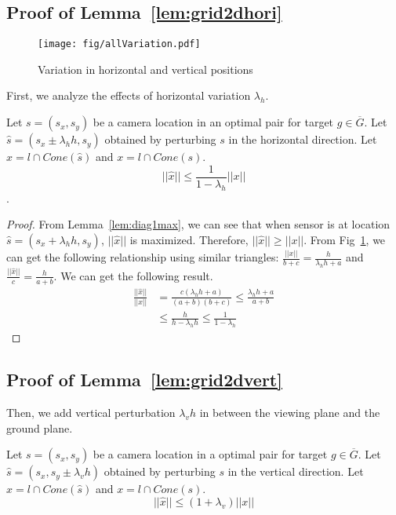 \subsection{Proof of Lemma~\ref{lem:grid2dhori}}
\begin{figure}[h]
\centering
	\texttt{[image: fig/allVariation.pdf]}
	\caption{Variation in horizontal and vertical positions}
	\label{fig:variation}
\end{figure} 
First, we analyze the effects of horizontal variation $\lambda_h$. 

\begin{lemma}\label{lem:grid2dhori}
Let $s = (s_x,s_y)$ be a camera location in an optimal pair for target $g \in \overline{G}$. Let $\hat{s} = (s_x \pm \lambda_hh, s_y)$ obtained by perturbing $s$ in the horizontal direction. 
Let $\hat{x} = l \cap Cone(\hat{s})$ and $x = l \cap Cone(s)$. 
$$||\hat{x}|| \leq \frac{1}{1-\lambda_h} ||x||$$. 
\end{lemma}

\begin{proof}
From Lemma~\ref{lem:diag1max}, we can see that when sensor is at location $\hat{s} = (s_x + \lambda_hh,s_y)$, $||\hat{x}||$ is maximized. Therefore, $||\hat{x}|| \geq ||x||$. From Fig~\ref{fig:variation}, we can get the following relationship using similar triangles: 
$\frac{||x||}{b+c} = \frac{h}{\lambda_hh + a}$
 and $\frac{||\hat{x}||}{c} = \frac{h}{a+b}$. 
We can get the following result.
\begin{align*}
\frac{||\hat{x}||}{||x||} &= \frac{c(\lambda_hh+a)}{(a+b)(b+c)}  \leq \frac{\lambda_hh + a}{a+b}\\
& \leq \frac{h}{h-\lambda_hh} \leq \frac{1}{1-\lambda_h}
\end{align*}
\end{proof}

\subsection{Proof of Lemma~\ref{lem:grid2dvert}}

Then, we add vertical perturbation $\lambda_v h$ in between the viewing plane and the ground plane.
\begin{lemma}\label{lem:grid2dvert}
Let $s = (s_x,s_y)$ be a camera location in a optimal pair for target $g \in \overline{G}$. Let $\hat{s} = (s_x, s_y \pm \lambda_vh)$ obtained by perturbing $s$ in the vertical direction. 
Let $\hat{x} = l \cap Cone(\hat{s})$ and $x = l \cap Cone(s)$. 
$$||\hat{x}|| \leq (1+\lambda_v) ||x||$$
\end{lemma}

